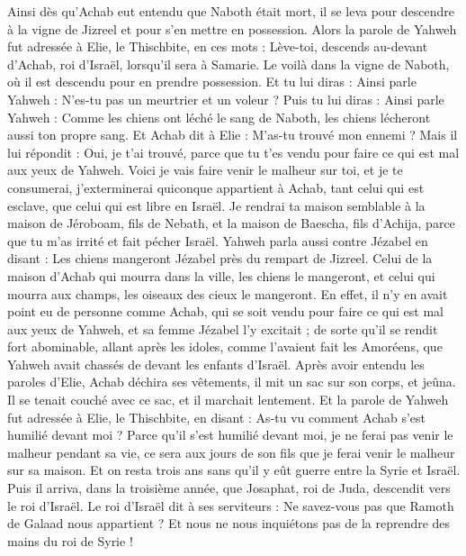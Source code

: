 \begin{multicols}{2}
Ainsi dès qu'Achab eut entendu que Naboth était mort, il se leva pour descendre à la vigne de Jizreel et pour s'en mettre en possession.
Alors la parole de Yahweh fut adressée à Elie, le Thischbite, en ces mots :
Lève-toi, descends au-devant d'Achab, roi d'Israël, lorsqu'il sera à Samarie. Le voilà dans la vigne de Naboth, où il est descendu pour en prendre possession.
Et tu lui diras : Ainsi parle Yahweh : N’es-tu pas un meurtrier et un voleur ? Puis tu lui diras : Ainsi parle Yahweh : Comme les chiens ont léché le sang de Naboth, les chiens lécheront aussi ton propre sang.
Et Achab dit à Elie : M'as-tu trouvé mon ennemi ? Mais il lui répondit : Oui, je t'ai trouvé, parce que tu t'es vendu pour faire ce qui est mal aux yeux de Yahweh.
Voici je vais faire venir le malheur sur toi, et je te consumerai, j’exterminerai quiconque appartient à Achab, tant celui qui est esclave, que celui qui est libre en Israël.
Je rendrai ta maison semblable à la maison de Jéroboam, fils de Nebath, et la maison de Baescha, fils d'Achija, parce que tu m'as irrité et fait pécher Israël.
Yahweh parla aussi contre Jézabel en disant : Les chiens mangeront Jézabel près du rempart de Jizreel.
Celui de la maison d’Achab qui mourra dans la ville, les chiens le mangeront, et celui qui mourra aux champs, les oiseaux des cieux le mangeront.
En effet, il n'y en avait point eu de personne comme Achab, qui se soit vendu pour faire ce qui est mal aux yeux de Yahweh, et sa femme Jézabel l’y excitait ;
de sorte qu'il se rendit fort abominable, allant après les idoles, comme l'avaient fait les Amoréens, que Yahweh avait chassés de devant les enfants d'Israël.
Après avoir entendu les paroles d’Elie, Achab déchira ses vêtements, il mit un sac sur son corps, et jeûna. Il se tenait couché avec ce sac, et il marchait lentement.
Et la parole de Yahweh fut adressée à Elie, le Thischbite, en disant :
As-tu vu comment Achab s'est humilié devant moi ? Parce qu'il s'est humilié devant moi, je ne ferai pas venir le malheur pendant sa vie, ce sera aux jours de son fils que je ferai venir le malheur sur sa maison.
\VerseOne{}Et on resta trois ans sans qu'il y eût guerre entre la Syrie et Israël.
Puis il arriva, dans la troisième année, que Josaphat, roi de Juda, descendit vers le roi d'Israël.
Le roi d'Israël dit à ses serviteurs : Ne savez-vous pas que Ramoth de Galaad nous appartient ? Et nous ne nous inquiétons pas de la reprendre des mains du roi de Syrie !

\end{multicols}
